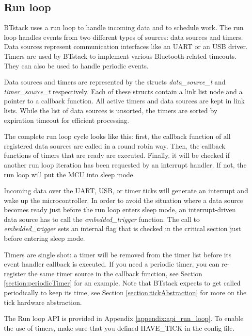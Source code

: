 \documentclass[a4paper,titlepage,oneside,12pt]{amsart} %
\begin{document}
\subsection{Run loop}
\label{section:run_loop}

BTstack uses a run loop to handle incoming data and to schedule work. The run loop handles events from two different types of sources: data sources and timers. Data sources represent communication interfaces like an UART or an USB driver. Timers are used by BTstack to implement various Bluetooth-related timeouts. They can also be used to handle periodic events. 

Data sources and timers are represented by the  structs \emph{data\_source\_t} and \emph{timer\_source\_t} respectively. Each of these structs contain a link list node and a pointer to a callback function. All active timers and data sources are kept in link lists. While the list of data sources is unsorted, the timers are sorted by expiration timeout for efficient processing.

The complete run loop cycle looks like this: first, the callback function of all registered data sources are called in a round robin way. Then, the callback functions of timers that are ready are executed. Finally, it will be checked if another run loop iteration has been requested by an interrupt handler. If not, the run loop will put the MCU into sleep mode.

Incoming data over the UART, USB, or timer ticks will generate an interrupt and wake up the microcontroller. In order to avoid the situation where a data source becomes ready just before the run loop enters sleep mode, an interrupt-driven data source has to call the \emph{embedded\_trigger} function. The call to \emph{embedded\_trigger} sets an internal flag that is checked in the critical section just before entering sleep mode. 

Timers are single shot: a timer will be removed from the timer list before its event handler callback is executed. If you need a periodic timer, you can re-register the same timer source in the callback function, see Section \ref{section:periodicTimer} for an example. Note that BTstack expects to get called periodically to keep its time, see Section \ref{section:tickAbstraction} for more on the tick hardware abstraction. 

The Run loop API is provided in Appendix \ref{appendix:api_run_loop}. To enable the use of timers, make sure that you defined HAVE\_TICK in the config file.
\end{document}
